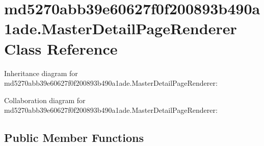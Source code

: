 \hypertarget{classmd5270abb39e60627f0f200893b490a1ade_1_1_master_detail_page_renderer}{}\section{md5270abb39e60627f0f200893b490a1ade.\+Master\+Detail\+Page\+Renderer Class Reference}
\label{classmd5270abb39e60627f0f200893b490a1ade_1_1_master_detail_page_renderer}


Inheritance diagram for md5270abb39e60627f0f200893b490a1ade.\+Master\+Detail\+Page\+Renderer\+:


Collaboration diagram for md5270abb39e60627f0f200893b490a1ade.\+Master\+Detail\+Page\+Renderer\+:
\subsection*{Public Member Functions}
